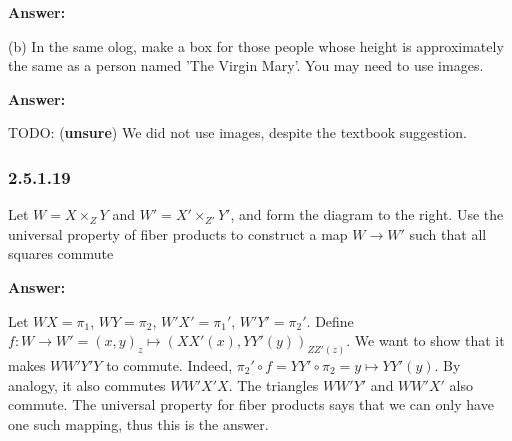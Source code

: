 \documentclass{article}
\newcommand{\Rational}{\mathbb{R}}
\newcommand{\vsp}[0]{\vspace*{10pt}\par}
\newcommand{\exercise}[1]{\subsubsection*{#1}}
\newcommand{\ans}[0]{\vsp\textbf{Answer: }\vsp}
\newcommand{\unsure}[0]{TODO: (\textbf{unsure}) }
\begin{document}
\ans

\begin{center}
\end{center}

(b) In the same olog, make a box for those people whose height is approximately
the same as a person named 'The Virgin Mary'. You may need to use images.

\ans

\begin{center}
\end{center}

\unsure We did not use images, despite the textbook suggestion.

\exercise{2.5.1.19}

Let $W = X \times_Z Y$ and $W' = X' \times_{Z'} Y'$, and form the diagram
to the right. Use the universal property of fiber products to construct a map
$W \to W'$ such that all squares commute

\ans

Let $WX = \pi_1$, $WY = \pi_2$, $W'X' = \pi_1'$, $W'Y' = \pi_2'$.  Define $f: W
\to W' = (x,y)_z \mapsto (XX'(x),YY'(y))_{ZZ'(z)}$. We want to show that it
makes $WW'Y'Y$ to commute. Indeed, $\pi_2' \circ f = YY' \circ \pi_2 = y
\mapsto YY'(y)$.  By analogy, it also commutes $WW'X'X$. The triangles $WW'Y'$
and $WW'X'$ also commute. The universal property for fiber products says that
we can only have one such mapping, thus this is the answer.
\end{document}
